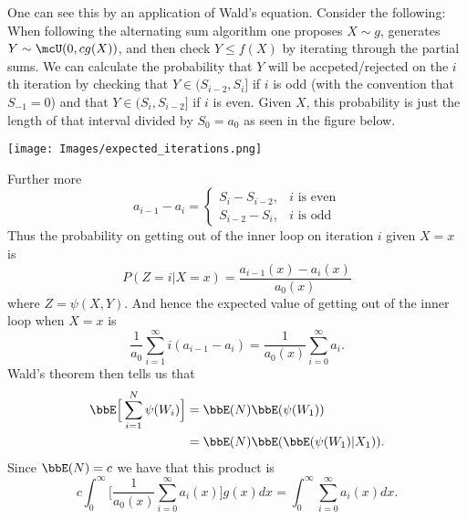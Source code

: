\documentclass[]{article}
\begin{document}
One can see this by an application of Wald's equation.  Consider the following:
When following the alternating sum algorithm one proposes $X \sim g$, generates
$Y \sim \mcU(0, cg(X))$, and then check $Y \leq f(X)$ by iterating through the
partial sums.  We can calculate the probability that $Y$ will be
accpeted/rejected on the $i$th iteration by checking that $Y \in (S_{i-2}, S_i]$
if $i$ is odd (with the convention that $S_{-1} = 0$) and that $Y
\in (S_i, S_{i-2}]$ if $i$ is even.  Given $X$, this probability is just the
length of that interval divided by $S_0 = a_0$ as seen in the figure below.
\begin{center}
\texttt{[image: Images/expected\_iterations.png]}
\end{center}
Further more
\[
a_{i-1} - a_{i} = 
\begin{cases}
S_{i} - S_{i-2}, & \text{$i$ is even} \\
S_{i-2} - S_i, & \text{$i$ is odd}
\end{cases}
\]
Thus the probability on getting out of the inner loop on iteration $i$ given $X=x$
is
\[
P(Z = i | X = x) = \frac{a_{i-1}(x) - a_i(x)}{a_0(x)}
\]
where $Z = \psi(X, Y)$.  And hence the expected value of
getting out of the inner loop when $X=x$ is
\[
\frac{1}{a_0} \sum_{i=1}^\infty i (a_{i-1} - a_i) = \frac{1}{a_0(x)}
\sum_{i=0}^\infty a_i.
\]
Wald's theorem then tells us that
\begin{align*}
\bbE \Big[ \sum_{i=1}^N \psi(W_i) \Big] 
& = \bbE(N) \bbE(\psi(W_1)) \\
& = \bbE(N) \bbE( \bbE(\psi(W_1)|X_1) ).
\end{align*}
Since $\bbE(N) = c$ we have that this product is
\[
c \int_{0}^\infty \Big[ \frac{1}{a_0(x)} \sum_{i=0}^\infty a_i(x) \Big] g(x) dx
= \int_{0}^\infty \sum_{i=0}^\infty a_i(x) dx.
\]
\end{document}
